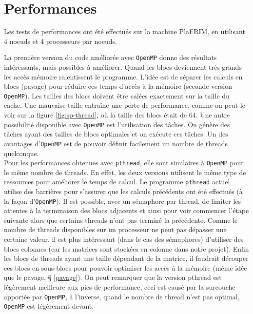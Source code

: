 \section{Performances} %
\label{sec:perf}

Les tests de performances ont été effectués sur la machine PlaFRIM, en utilisant 4 noeuds et 4 processeurs par noeuds.

La première version du code améliorée avec \texttt{OpenMP} donne des résultats intéressants, mais possibles à améliorer. Quand les blocs deviennent très grands les accès mémoire ralentissent le programme. L'idée est de séparer les calculs en blocs (pavage) pour réduire ces temps d'accès à la mémoire (seconde version \texttt{OpenMP}). Les tailles des blocs doivent être calées exactement sur la taille du cache. Une mauvaise taille entraîne une perte de performance, comme on peut le voir sur la figure \ref{fig:sp-thread}, où la taille des blocs était de $64$. Une autre possibilité disponible avec \texttt{OpenMP} est l'utilisation des tâches. On génère des tâches ayant des tailles de blocs optimales et on exécute ces tâches. Un des avantages d'\texttt{OpenMP} est de pouvoir définir facilement un nombre de threads quelconque.\\

Pour les performances obtenues avec \texttt{pthread}, elle sont similaires à \texttt{OpenMP} pour le même nombre de threads. En effet, les deux versions utilisent le même type de ressources pour améliorer le temps de calcul. Le programme \texttt{pthread} actuel utilise des barrières pour s'assurer que les calculs précédents ont été effectués (à la façon d'\texttt{OpenMP}). Il est possible, avec un sémaphore par thread, de limiter les attentes à la terminaison des blocs adjacents et ainsi pour voir commencer l'étape suivante alors que certains threads n'ont pas terminé la précédente. Comme le nombre de threads disponibles sur un processeur ne peut pas dépasser une certaine valeur, il est plus intéressant (dans le cas des sémaphores) d'utiliser des blocs colonnes (car les matrices sont stockées en colonne dans notre projet). Enfin les blocs de threads ayant une taille dépendant de la matrice, il faudrait découper ces blocs en sous-blocs pour pouvoir optimiser les accès à la mémoire (même idée que le pavage, § \ref{pavage}). On peut remarquer que la version pthread est légèrement meilleure aux pics de performance, ceci est causé par la surcouche apportée par \texttt{OpenMP}, à l'inverse, quand le nombre de thread n'est pas optimal, \texttt{OpenMP} est légèrement devant.

